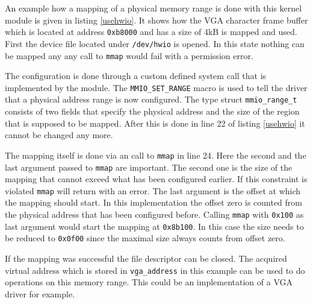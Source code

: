 \documentclass[
a4paper,
11pt,
twoside
]{report}
\begin{document}
		An example how a mapping of a physical memory range is done with this kernel module is given in listing \ref{usehwio}.
		It shows how the VGA character frame buffer which is located at address \texttt{0xb8000} and has a size of 4kB is mapped and used.
		First the device file located under \texttt{/dev/hwio} is opened.
		In this state nothing can be mapped any any call to \texttt{mmap} would fail with a permission error.
		
		The configuration is done through a custom defined system call that is implemented by the module.
		The \texttt{MMIO\_SET\_RANGE} macro is used to tell the driver that a physical address range is now configured.
		The type struct \texttt{mmio\_range\_t} consists of two fields that specify the physical address and the size of the region that is supposed to be mapped.
		After this is done in line 22 of listing \ref{usehwio} it cannot be changed any more.
		
		The mapping itself is done via an call to \texttt{mmap} in line 24.
		Here the second and the last argument passed to \texttt{mmap} are important.
		The second one is the size of the mapping that cannot exceed what has been configured earlier.
		If this constraint is violated \texttt{mmap} will return with an error.
		The last argument is the offset at which the mapping should start.
		In this implementation the offset zero is counted from the physical address that has been configured before.
		Calling \texttt{mmap} with \texttt{0x100} as last argument would start the mapping at \texttt{0x8b100}.
		In this case the size needs to be reduced to \texttt{0x0f00} since the maximal size always counts from offset zero.
		
		If the mapping was successful the file descriptor can be closed.
		The acquired virtual address which is stored in \texttt{vga\_address} in this example can be used to do operations on this memory range.
		This could be an implementation of a VGA driver for example.
		
\end{document}
